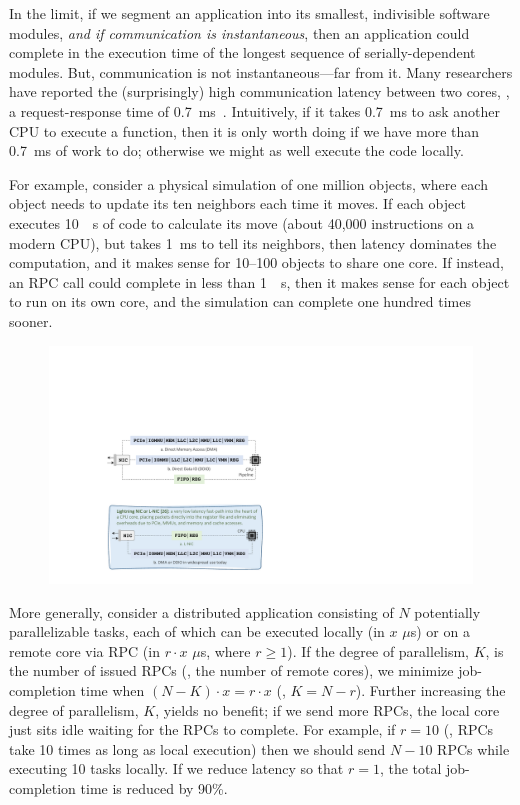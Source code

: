 In the limit, if we segment an application into its smallest, indivisible software modules, {\em and if communication is instantaneous}, then an application could complete in the execution time of the longest sequence of serially-dependent modules.
But, communication is not instantaneous---far from it. 
Many researchers have reported the (surprisingly) high communication latency between two cores, \eg, a request-response time of \SI{0.7}{ms}~\cite{eRPC, perfkit-grpc}.
Intuitively, if it takes \SI{0.7}{ms} to ask another CPU to execute a function, then it is only worth doing if we have more than \SI{0.7}{ms} of work to do; otherwise we might as well execute the code locally. 

For example, consider a physical simulation of one million objects, where each object needs to update its ten neighbors each time it moves. 
If each object executes \SI{10}{\mu s} of code to calculate its move (about 40,000 instructions on a modern CPU), but takes \SI{1}{ms} to tell its neighbors, then latency dominates the computation, and it makes sense for 10--100 objects to share one core. 
If instead, an RPC call could complete in less than \SI{1}{\mu s}, then it makes sense for each object to run on its own core, and the simulation can complete one hundred times sooner. 

\begin{figure}[t]
  \includegraphics[width=\linewidth]{./figures/lnic-fbox}
  \label{fig:lnic-fbox}
\end{figure}

More generally, consider a distributed application consisting of $N$ potentially parallelizable tasks, each of which can be executed locally (in $x$ $\mu$s) or on a remote core via RPC (in $r \cdot x$ $\mu$s, where $r \ge 1$). 
If the degree of parallelism, $K$, is the number of issued RPCs (\ie, the number of remote cores), we minimize job-completion time when $(N - K)\cdot x = r \cdot x$ (\ie, $K = N - r$). 
Further increasing the degree of parallelism, $K$, yields no benefit; if we send more RPCs, the local core just sits idle waiting for the RPCs to complete. 
For example, if $r = 10$ (\ie, RPCs take 10 times as long as local execution) then we should send $N-10$ RPCs while executing 10 tasks locally. 
If we reduce latency so that $r=1$, the total job-completion time is reduced by 90\%.  

